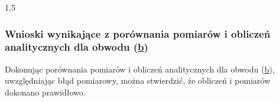 \documentclass[polish,polish,a4paper]{article}
\begin{document}
\begin{spacing}{1,5}
		\subsubsection*{Wnioski wynikające z porównania pomiarów i obliczeń analitycznych dla obwodu (\hyperref[eq:ob2b]{b})}
		
						Dokonując porównania pomiarów i obliczeń analitycznych dla obwodu (\hyperref[eq:ob2b]{b}), uwzględniając błąd pomiarowy, można stwierdzić, że obliczeń i pomiarów dokonano prawidłowo.
		
		\newpage
		
		\tableofcontents
		
	\end{spacing}
\end{document}
